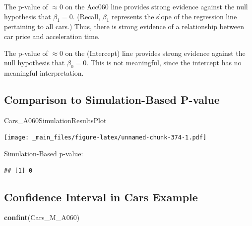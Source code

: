\documentclass[]{book}
\newenvironment{Shaded}{\begin{snugshade}}{\end{snugshade}}
\newcommand{\KeywordTok}[1]{\textcolor[rgb]{0.13,0.29,0.53}{\textbf{#1}}}
\newcommand{\DecValTok}[1]{\textcolor[rgb]{0.00,0.00,0.81}{#1}}
\newcommand{\StringTok}[1]{\textcolor[rgb]{0.31,0.60,0.02}{#1}}
\newcommand{\OperatorTok}[1]{\textcolor[rgb]{0.81,0.36,0.00}{\textbf{#1}}}
\newcommand{\NormalTok}[1]{#1}
\begin{document}
The p-value of \(\approx 0\) on the Acc060 line provides strong evidence
against the null hypothesis that \(\beta_1=0\). (Recall, \(\beta_1\)
represents the slope of the regression line pertaining to all cars.)
Thus, there is strong evidence of a relationship between car price and
acceleration time.

The p-value of \(\approx 0\) on the (Intercept) line provides strong
evidence against the null hypothesis that \(\beta_0=0\). This is not
meaningful, since the intercept has no meaningful interpretation.

\subsection{Comparison to Simulation-Based
P-value}\label{comparison-to-simulation-based-p-value}

\begin{Shaded}
\begin{Highlighting}[]
\NormalTok{Cars_A060SimulationResultsPlot}
\end{Highlighting}
\end{Shaded}

\texttt{[image: \_main\_files/figure-latex/unnamed-chunk-374-1.pdf]}

Simulation-Based p-value:

\begin{Shaded}
\end{Shaded}

\begin{verbatim}
## [1] 0
\end{verbatim}

\subsection{Confidence Interval in Cars
Example}\label{confidence-interval-in-cars-example}

\begin{Shaded}
\begin{Highlighting}[]
\KeywordTok{confint}\NormalTok{(Cars_M_A060)}
\end{Highlighting}
\end{Shaded}
\end{document}
